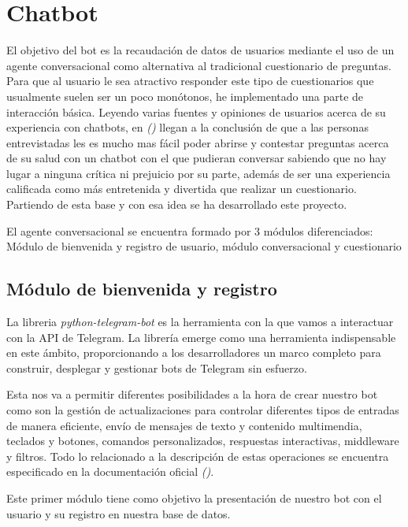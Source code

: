 \chapter{Chatbot}

El objetivo del bot es la recaudación de datos de usuarios mediante el uso de un agente conversacional como alternativa al tradicional cuestionario de preguntas. Para que al usuario le sea atractivo responder este tipo de cuestionarios que usualmente suelen ser un poco monótonos, he implementado una parte de interacción básica. Leyendo varias fuentes y opiniones de usuarios acerca de su experiencia con chatbots, 
 en \textit{(\cite{wellbeingchabot})} llegan a la conclusión de que a las personas entrevistadas les es mucho mas fácil poder abrirse y contestar preguntas acerca de su salud con un chatbot con el que pudieran conversar sabiendo que no hay lugar a ninguna crítica ni prejuicio por su parte, además de ser una experiencia calificada como más entretenida y divertida que realizar un cuestionario. Partiendo de esta base y con esa idea se ha desarrollado este proyecto. 

El agente conversacional se encuentra formado por 3 módulos diferenciados: Módulo de bienvenida y registro de usuario, módulo conversacional y cuestionario

\section{Módulo de bienvenida y registro}

La libreria \textit{python-telegram-bot} es la herramienta con la que vamos a interactuar con la API de Telegram. La librería emerge como una herramienta indispensable en este ámbito, proporcionando a los desarrolladores un marco completo para construir, desplegar y gestionar bots de Telegram sin esfuerzo.

Esta nos va a permitir diferentes posibilidades a la hora de crear nuestro bot como son la gestión de actualizaciones para controlar diferentes tipos de entradas de manera eficiente, envío de mensajes de texto y contenido multimendia, teclados y botones, comandos personalizados, respuestas interactivas, middleware y filtros. Todo lo relacionado a la descripción de estas operaciones se encuentra especificado en la documentación oficial \textit{(\cite{pythontelegrambot})}.

Este primer módulo tiene como objetivo la presentación de nuestro bot con el usuario y su registro en nuestra base de datos. 

